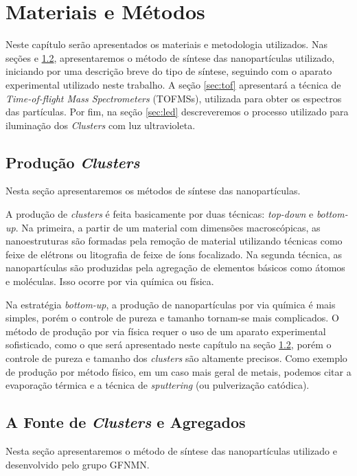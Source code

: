 \chapter{Materiais e Métodos}
\label{materiais_e_metodos}

Neste capítulo serão apresentados os materiais e metodologia utilizados. Nas seções \label{sec:producao_cluster} e \ref{sec:foca}, apresentaremos
o método de síntese das nanopartículas utilizado, iniciando por uma descrição breve do tipo de síntese, seguindo com o aparato experimental utilizado neste trabalho. A seção \ref{sec:tof} apresentará a técnica de \textit{Time-of-flight Mass Spectrometers} (TOFMSs), utilizada para obter os espectros das partículas. Por fim, na seção \ref{sec:led} descreveremos o processo utilizado para iluminação dos \textit{Clusters} com luz ultravioleta.


\section{Produção \textit{Clusters}}
\label{sec:producao_cluster}

Nesta seção apresentaremos os métodos de síntese das nanopartículas.

A produção de \textit{clusters} é feita basicamente por duas técnicas: \textit{top-down} e \textit{bottom-up}. Na primeira, a partir de um material com dimensões macroscópicas, as nanoestruturas são formadas pela remoção de material utilizando técnicas como feixe de elétrons ou litografia de feixe de íons focalizado. Na segunda técnica, as nanopartículas são produzidas pela agregação de elementos básicos como átomos e moléculas. Isso ocorre por via química ou física.

Na estratégia \textit{bottom-up}, a produção de nanopartículas por via química é mais simples, porém o controle de pureza e tamanho tornam-se mais complicados. O método de produção por via física requer o uso de um aparato experimental sofisticado, como o que será apresentado neste capítulo na seção \ref{sec:foca}, porém o controle de pureza e tamanho dos \textit{clusters} são altamente precisos. Como exemplo de produção por método físico, em um caso mais geral de metais, podemos citar a evaporação térmica e a técnica de \textit{sputtering} (ou pulverização catódica).

\section{A Fonte de \textit{Clusters} e Agregados}
\label{sec:foca}
Nesta seção apresentaremos o método de síntese das nanopartículas utilizado e desenvolvido pelo grupo GFNMN.


